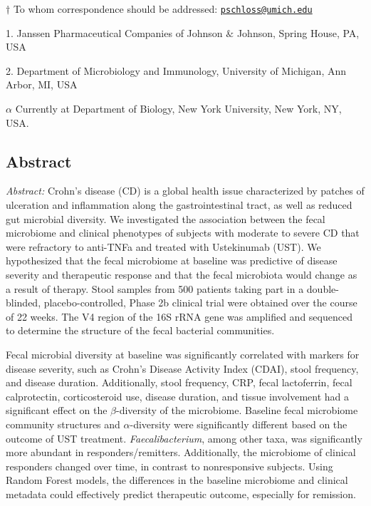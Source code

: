 \documentclass[11pt,]{article}
\begin{document}
\(\dagger\) To whom correspondence should be addressed:
\href{mailto:pschloss@umich.edu}{\nolinkurl{pschloss@umich.edu}}

1. Janssen Pharmaceutical Companies of Johnson \({\&}\) Johnson, Spring
House, PA, USA

2. Department of Microbiology and Immunology, University of Michigan,
Ann Arbor, MI, USA

\({\alpha}\) Currently at Department of Biology, New York University,
New York, NY, USA.

\newpage

\subsection{Abstract}\label{abstract}

\emph{Abstract:} Crohn's disease (CD) is a global health issue
characterized by patches of ulceration and inflammation along the
gastrointestinal tract, as well as reduced gut microbial diversity. We
investigated the association between the fecal microbiome and clinical
phenotypes of subjects with moderate to severe CD that were refractory
to anti-TNFa and treated with Ustekinumab (UST). We hypothesized that
the fecal microbiome at baseline was predictive of disease severity and
therapeutic response and that the fecal microbiota would change as a
result of therapy. Stool samples from 500 patients taking part in a
double-blinded, placebo-controlled, Phase 2b clinical trial were
obtained over the course of 22 weeks. The V4 region of the 16S rRNA gene
was amplified and sequenced to determine the structure of the fecal
bacterial communities.

Fecal microbial diversity at baseline was significantly correlated with
markers for disease severity, such as Crohn's Disease Activity Index
(CDAI), stool frequency, and disease duration. Additionally, stool
frequency, CRP, fecal lactoferrin, fecal calprotectin, corticosteroid
use, disease duration, and tissue involvement had a significant effect
on the \({\beta}\)-diversity of the microbiome. Baseline fecal
microbiome community structures and \({\alpha}\)-diversity were
significantly different based on the outcome of UST treatment.
\emph{Faecalibacterium}, among other taxa, was significantly more
abundant in responders/remitters. Additionally, the microbiome of
clinical responders changed over time, in contrast to nonresponsive
subjects. Using Random Forest models, the differences in the baseline
microbiome and clinical metadata could effectively predict therapeutic
outcome, especially for remission.
\end{document}
